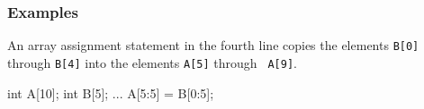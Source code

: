 
\subsubsection*{Examples}

An array assignment statement in the fourth line copies the elements
{\tt B[0]} through {\tt B[4]} into the elements {\tt A[5]} through {\tt
A[9]}.

\hspace{\hsize}
\begin{XCexample}
int A[10];
int B[5];
    ...
A[5:5] = B[0:5]; 
\end{XCexample}






